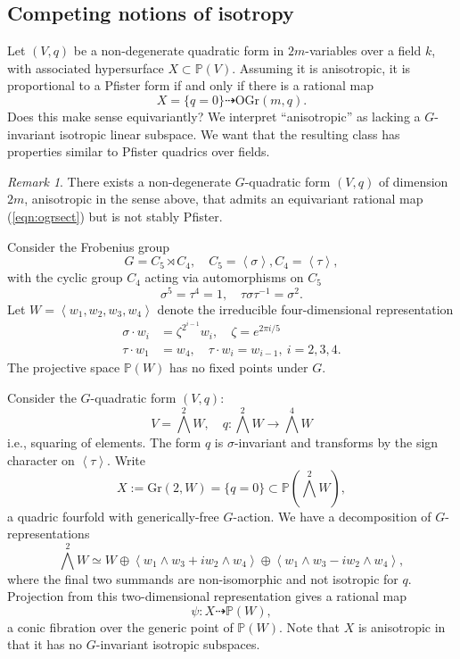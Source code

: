 \documentclass[12pt]{amsart}
\numberwithin{equation}{section}
\newcommand{\ra}{\rightarrow}
\newcommand{\bP}{\mathbb{P}}
\newcommand{\Gr}{\mathrm{Gr}}
\newcommand{\OGr}{\mathrm{OGr}}
\theoremstyle{plain}
\theoremstyle{definition}
\theoremstyle{remark}
\newtheorem{rema}[prop]{Remark}
\begin{document}
\subsection*{Competing notions of isotropy}

Let $(V,q)$ be a non-degenerate quadratic form in $2m$-variables over a field $k$,
with associated hypersurface $X\subset \bP(V)$. 
Assuming it is anisotropic, it is proportional to a Pfister form if and only if there is a rational map
\begin{equation}
 \label{eqn:ogrsect}
X=\{q=0\} \dashrightarrow \OGr(m,q).
\end{equation} 
Does this make sense equivariantly? We interpret ``anisotropic'' as lacking a
$G$-invariant isotropic linear subspace.  We want that the resulting class has properties similar to Pfister quadrics over fields.


\begin{rema} \label{rema:anisoRMnotSP}
There exists a non-degenerate $G$-quadratic form $(V,q)$
of dimension $2m$,
anisotropic in the sense above, that admits an equivariant rational map (\ref{eqn:ogrsect})
but is not stably Pfister.
\end{rema}

Consider the Frobenius group
$$G = C_5 \rtimes C_4, \quad C_5 = \left< \sigma \right>, C_4 = \left< \tau \right>,$$
with the cyclic group $C_4$ acting via automorphisms on $C_5$
$$\sigma^5=\tau^4=1, \quad \tau \sigma \tau^{-1} = \sigma^2.$$
Let $W=\left<w_1,w_2,w_3,w_4\right>$ denote the irreducible four-dimensional representation
\begin{align*}
 \sigma \cdot w_i &= \zeta^{2^{i-1}} w_i, \quad \zeta=e^{2\pi i/5} \\
\tau \cdot w_1 &= w_4, \quad \tau \cdot w_i = w_{i-1}, \ i=2,3,4.
\end{align*}
The projective space $\bP(W)$ has no fixed points under $G$.

Consider the $G$-quadratic form $(V,q)$:
$$V=\bigwedge^2 W, \quad
q:\bigwedge^2 W \ra \bigwedge^4 W$$
i.e., squaring of elements. The form $q$ is $\sigma$-invariant and transforms by the
sign character on $\left<\tau\right>$.
Write
$$X := \Gr(2,W) = \{q=0\} \subset \bP(\bigwedge^2 W),$$
a quadric fourfold with generically-free $G$-action.
We have a decomposition of $G$-representations
$$\bigwedge^2 W \simeq W \oplus \left< w_1\wedge w_3+ i w_2\wedge w_4\right> \oplus
				\left<w_1\wedge w_3 - i w_2\wedge w_4\right>,$$
where the final two summands are non-isomorphic and not isotropic for $q$. 
Projection from this two-dimensional representation gives a rational map
$$\psi: X \dashrightarrow \bP(W),$$
a conic fibration over the generic point of $\bP(W)$. 
Note that $X$ is anisotropic in that it has no $G$-invariant isotropic subspaces.  
\end{document}
